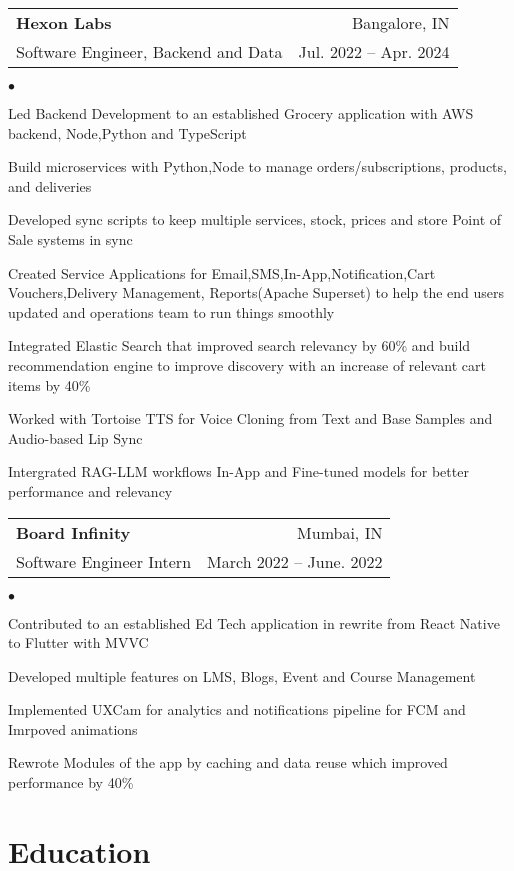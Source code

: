 \documentclass[margin, 11pt]{res}
\makeatletter
\newcommand{\resumeSubheading}[4]{

\begin{tabular*}{1.01\textwidth}{@{\hspace{-4pt}}l @{\extracolsep{\fill}} r}
\textbf{#1} & #2 \\
      {#3} &  {#4}
\end{tabular*}\vspace{-2pt}
}
\newenvironment{list2}{
	\begin{list}{$\bullet$}{%
	    \small
		\setlength{\itemsep}{0in}
		\setlength{\parsep}{0in} \setlength{\parskip}{0in}
		\setlength{\topsep}{0in} \setlength{\partopsep}{0in}
		\setlength{\leftmargin}{0.2in}}}{\end{list}}
\makeatother
\begin{document}
\begin{resume}
\resumeSubheading{{\bf Hexon Labs}}{Bangalore, IN}
                 {Software Engineer, Backend and Data}{Jul. 2022 -- Apr. 2024}

\begin{list2}
\item{Led Backend Development to an established Grocery application with AWS backend, Node,Python and TypeScript}
\item{Build microservices with Python,Node to  manage orders/subscriptions, products, and deliveries}
\item{Developed sync scripts to keep multiple services, stock, prices and store Point of Sale systems in sync}
\item{Created Service Applications for Email,SMS,In-App,Notification,Cart Vouchers,Delivery Management, Reports(Apache Superset) to help the end users updated and operations team to run things smoothly}
\item{Integrated Elastic Search that improved search relevancy by 60\% and build recommendation engine to improve discovery with an increase of relevant cart items by 40\% }
\item{Worked with Tortoise TTS for Voice Cloning from Text and Base Samples and Audio-based Lip Sync}
\item{Intergrated RAG-LLM workflows In-App and Fine-tuned models for better performance and relevancy}
\end{list2}
\resumeSubheading{{\bf Board Infinity}}{Mumbai, IN}
                 {Software Engineer Intern}{March 2022 -- June. 2022}
                 
\begin{list2}
\item{Contributed to an established Ed Tech application in rewrite from React Native to Flutter with MVVC}
\item{Developed multiple features on LMS, Blogs, Event and Course Management}
\item{Implemented UXCam for analytics and notifications pipeline for FCM and Imrpoved animations}
\item{Rewrote Modules of the app by caching and data reuse which improved performance by 40\%}
\end{list2}

\section{\sc Education}


\end{resume}
\end{document}
